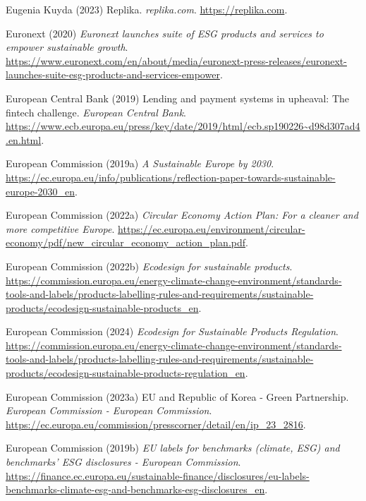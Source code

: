 \documentclass[
  letterpaper,
  DIV=11,
  numbers=noendperiod]{scrartcl}
\newlength{\cslhangindent}
\newenvironment{CSLReferences}[2] %
 {\begin{list}{}{%
  \setlength{\itemindent}{0pt}
  \setlength{\leftmargin}{0pt}
  \setlength{\parsep}{0pt}
  \ifodd #1
   \setlength{\leftmargin}{\cslhangindent}
   \setlength{\itemindent}{-1\cslhangindent}
  \fi
  \setlength{\itemsep}{#2\baselineskip}}}
 {\end{list}}
\begin{document}
\begin{CSLReferences}{0}{1}
Eugenia Kuyda (2023) Replika. \emph{replika.com}.
\url{https://replika.com}.

Euronext (2020) \emph{Euronext launches suite of {ESG} products and
services to empower sustainable growth}.
\url{https://www.euronext.com/en/about/media/euronext-press-releases/euronext-launches-suite-esg-products-and-services-empower}.

European Central Bank (2019) Lending and payment systems in upheaval:
The fintech challenge. \emph{European Central Bank}.
\url{https://www.ecb.europa.eu/press/key/date/2019/html/ecb.sp190226~d98d307ad4.en.html}.

European Commission (2019a) \emph{A {Sustainable Europe} by 2030}.
\url{https://ec.europa.eu/info/publications/reflection-paper-towards-sustainable-europe-2030_en}.

European Commission (2022a) \emph{Circular {Economy Action Plan}: {For}
a cleaner and more competitive {Europe}}.
\url{https://ec.europa.eu/environment/circular-economy/pdf/new_circular_economy_action_plan.pdf}.

European Commission (2022b) \emph{Ecodesign for sustainable products}.
\url{https://commission.europa.eu/energy-climate-change-environment/standards-tools-and-labels/products-labelling-rules-and-requirements/sustainable-products/ecodesign-sustainable-products_en}.

European Commission (2024) \emph{Ecodesign for {Sustainable Products
Regulation}}.
\url{https://commission.europa.eu/energy-climate-change-environment/standards-tools-and-labels/products-labelling-rules-and-requirements/sustainable-products/ecodesign-sustainable-products-regulation_en}.

European Commission (2023a) {EU} and {Republic} of {Korea} - {Green
Partnership}. \emph{European Commission - European Commission}.
\url{https://ec.europa.eu/commission/presscorner/detail/en/ip_23_2816}.

European Commission (2019b) \emph{{EU} labels for benchmarks (climate,
{ESG}) and benchmarks' {ESG} disclosures - {European Commission}}.
\url{https://finance.ec.europa.eu/sustainable-finance/disclosures/eu-labels-benchmarks-climate-esg-and-benchmarks-esg-disclosures_en}.


\end{CSLReferences}
\end{document}
